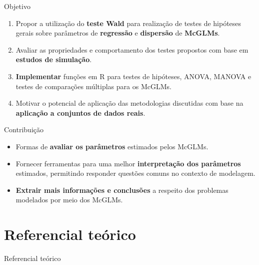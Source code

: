\documentclass[
  ignorenonframetext,
  serif,
  professionalfont,
  usenames,
  dvipsnames,
  aspectratio = 169]{beamer}
\begin{document}
\begin{frame}{Objetivo}
\protect\hypertarget{objetivo}{}
\begin{enumerate}
  \itemsep 2ex
  
 \item Propor a utilização do \textbf{teste Wald} para realização de testes de hipóteses gerais sobre parâmetros de \textbf{regressão} e \textbf{dispersão} de \textbf{McGLMs}.

 \item Avaliar as propriedades e comportamento dos testes propostos com base em \textbf{estudos de simulação}.
 
 \item \textbf{Implementar} funções em R para testes de hipóteses, ANOVA, MANOVA e testes de comparações múltiplas para os McGLMs. 
 
 \item Motivar o potencial de aplicação das metodologias discutidas com base na \textbf{aplicação a conjuntos de dados reais}.

\end{enumerate}
\end{frame}

\begin{frame}{Contribuição}
\protect\hypertarget{contribuiuxe7uxe3o}{}
\begin{itemize}
  \itemsep 2ex
  
  \item Formas de \textbf{avaliar os parâmetros} estimados pelos McGLMs.

  \item Fornecer ferramentas para uma melhor \textbf{interpretação dos parâmetros} estimados, permitindo responder questões comuns no contexto de modelagem.
  
  \item \textbf{Extrair mais informações e conclusões} a respeito dos problemas modelados por meio dos McGLMs.

\end{itemize}
\end{frame}

\hypertarget{referencial-teuxf3rico}{%
\section{Referencial teórico}\label{referencial-teuxf3rico}}

\begin{frame}{Referencial teórico}
\end{frame}
\end{document}
